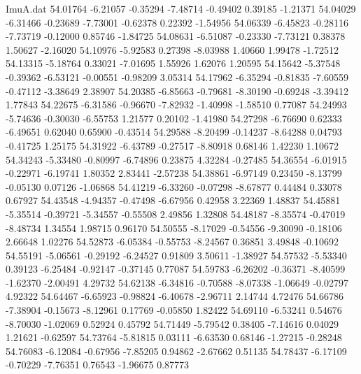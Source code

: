 \begin{filecontents}{ImuA.dat}
  54.01764   -6.21057   -0.35294   -7.48714   -0.49402    0.39185   -1.21371
  54.04029   -6.31466   -0.23689   -7.73001   -0.62378    0.22392   -1.54956
  54.06339   -6.45823   -0.28116   -7.73719   -0.12000    0.85746   -1.84725
  54.08631   -6.51087   -0.23330   -7.73121    0.38378    1.50627   -2.16020
  54.10976   -5.92583    0.27398   -8.03988    1.40660    1.99478   -1.72512
  54.13315   -5.18764    0.33021   -7.01695    1.55926    1.62076    1.20595
  54.15642   -5.37548   -0.39362   -6.53121   -0.00551   -0.98209    3.05314
  54.17962   -6.35294   -0.81835   -7.60559   -0.47112   -3.38649    2.38907
  54.20385   -6.85663   -0.79681   -8.30190   -0.69248   -3.39412    1.77843
  54.22675   -6.31586   -0.96670   -7.82932   -1.40998   -1.58510    0.77087
  54.24993   -5.74636   -0.30030   -6.55753    1.21577    0.20102   -1.41980
  54.27298   -6.76690    0.62333   -6.49651    0.62040    0.65900   -0.43514
  54.29588   -8.20499   -0.14237   -8.64288    0.04793   -0.41725    1.25175
  54.31922   -6.43789   -0.27517   -8.80918    0.68146    1.42230    1.10672
  54.34243   -5.33480   -0.80997   -6.74896    0.23875    4.32284   -0.27485
  54.36554   -6.01915   -0.22971   -6.19741    1.80352    2.83441   -2.57238
  54.38861   -6.97149    0.23450   -8.13799   -0.05130    0.07126   -1.06868
  54.41219   -6.33260   -0.07298   -8.67877    0.44484    0.33078    0.67927
  54.43548   -4.94357   -0.47498   -6.67956    0.42958    3.22369    1.48837
  54.45881   -5.35514   -0.39721   -5.34557   -0.55508    2.49856    1.32808
  54.48187   -8.35574   -0.47019   -8.48734    1.34554    1.98715    0.96170
  54.50555   -8.17029   -0.54556   -9.30090   -0.18106    2.66648    1.02276
  54.52873   -6.05384   -0.55753   -8.24567    0.36851    3.49848   -0.10692
  54.55191   -5.06561   -0.29192   -6.24527    0.91809    3.50611   -1.38927
  54.57532   -5.53340    0.39123   -6.25484   -0.92147   -0.37145    0.77087
  54.59783   -6.26202   -0.36371   -8.40599   -1.62370   -2.00491    4.29732
  54.62138   -6.34816   -0.70588   -8.07338   -1.06649   -0.02797    4.92322
  54.64467   -6.65923   -0.98824   -6.40678   -2.96711    2.14744    4.72476
  54.66786   -7.38904   -0.15673   -8.12961    0.17769   -0.05850    1.82422
  54.69110   -6.53241    0.54676   -8.70030   -1.02069    0.52924    0.45792
  54.71449   -5.79542    0.38405   -7.14616    0.04029    1.21621   -0.62597
  54.73764   -5.81815    0.03111   -6.63530    0.68146   -1.27215   -0.28248
  54.76083   -6.12084   -0.67956   -7.85205    0.94862   -2.67662    0.51135
  54.78437   -6.17109   -0.70229   -7.76351    0.76543   -1.96675    0.87773

\end{filecontents}
